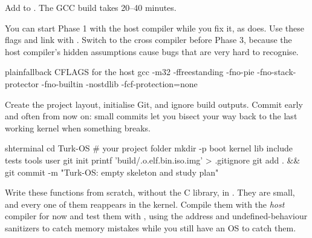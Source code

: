 \documentclass[11pt,a4paper]{article}
\begin{document}
Add  to . The GCC build takes 20--40 minutes.

\begin{tipbox}
You can start Phase 1 with the host compiler while you fix it, as \LOB does. Use these flags and link with
. Switch to the cross compiler before Phase 3, because the host compiler's hidden assumptions
cause bugs that are very hard to recognise.
\begin{lst}{plain}{fallback CFLAGS for the host gcc}
-m32 -ffreestanding -fno-pie -fno-stack-protector -fno-builtin -nostdlib -fcf-protection=none
\end{lst}
\end{tipbox}

Create the project layout, initialise Git, and ignore build outputs. Commit early and often from now on: small
commits let you bisect your way back to the last working kernel when something breaks.

\begin{lst}{sh}{terminal}
cd Turk-OS                     # your project folder
mkdir -p boot kernel lib include tests tools user
git init
printf 'build/\n*.o\n*.elf\n*.bin\n*.iso\n*.img\n' > .gitignore
git add . && git commit -m "Turk-OS: empty skeleton and study plan"
\end{lst}

Write these functions from scratch, without the C library, in . They are small, and every one of them
reappears in the kernel. Compile them with the \emph{host} compiler for now and test them with , using the
address and undefined-behaviour sanitizers to catch memory mistakes while you still have an OS to catch them.
\end{document}
